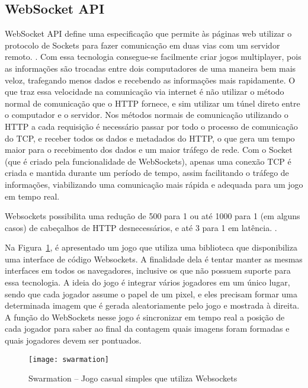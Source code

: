 \subsection{WebSocket API}

WebSocket API define uma especificação que permite às páginas web
utilizar o protocolo de Sockets para fazer comunicação em duas
vias com um servidor remoto. \cite{website:w3cwebsockets}. Com essa tecnologia
consegue-se facilmente criar jogos multiplayer, pois as informações
são trocadas entre dois computadores de uma maneira bem mais
veloz, trafegando menos dados e recebendo as informações mais
rapidamente.
O que traz essa velocidade na comunicação via internet é não utilizar
o método normal de comunicação que o HTTP fornece, e sim utilizar um
túnel direto entre o computador e o servidor.
Nos métodos normais de comunicação utilizando o HTTP a cada requisição
é necessário passar por todo o processo de comunicação do TCP, e
receber todos os dados e metadados do HTTP, o que gera um tempo maior para
o recebimento dos dados e um maior tráfego de rede. Com o Socket (que
é criado pela funcionalidade de WebSockets), apenas uma conexão TCP é
criada e mantida durante um período de tempo, assim facilitando o
tráfego de informações, viabilizando uma comunicação mais rápida e
adequada para um jogo em tempo real.

Websockets possibilita uma redução de 500 para 1 ou até 1000 para 1
(em alguns casos) de cabeçalhos de HTTP desnecessários, e até 3 para 1
em latência. \cite{lubbers2010pro}.

Na Figura~\ref{img:swarmation}, é apresentado um jogo que utiliza
uma biblioteca que disponibiliza uma interface de código Websockets.
A finalidade dela é tentar manter as mesmas interfaces em
todos os navegadores, inclusive os que não possuem suporte para essa
tecnologia. A ideia do jogo é integrar vários jogadores em um único lugar, sendo que
cada jogador assume o papel de um pixel, e eles precisam formar uma
determinada imagem que é gerada aleatoriamente pelo jogo e mostrada à
direita. A função do WebSockets nesse jogo é sincronizar em tempo real a
posição de cada jogador para saber ao final da contagem quais imagens
foram formadas e quais jogadores devem ser pontuados.

\begin{figure}[H]
  \centering
	\texttt{[image: swarmation]}
  \caption{Swarmation {--} Jogo casual simples que utiliza Websockets}
  \label{img:swarmation}
\end{figure}


